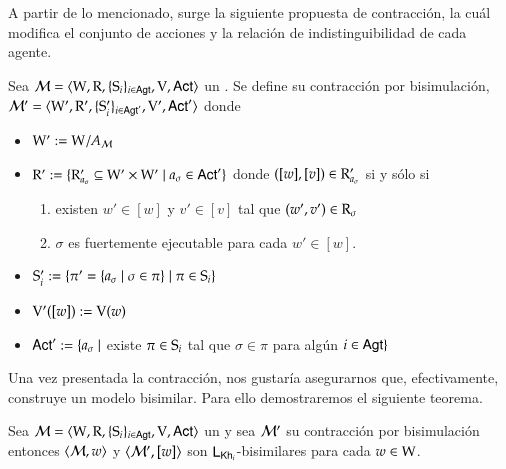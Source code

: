 A partir de lo mencionado, surge la siguiente propuesta de contracción, la cuál modifica el conjunto de acciones y la relación de indistinguibilidad 
de cada agente.


\begin{definicion}
    Sea $\model=\tup{\W,\R,\cset{\S_i}_{i \in \AGT},\V,\ACT}$ un \ults. Se define su contracción por bisimulación, $\model'=\tup{\W',\R',\cset{\S_i'}_{i \in \AGT'},\V',\ACT'}$ donde 
    \begin{center}
        \begin{itemize}
            \item $\W' := \W/A_\modults$
            \item $\R' := \{\R'_{a_\sigma} \subseteq \W' \times \W' \mid a_\sigma \in \ACT'\}$ donde $([w],[v]) \in \R'_{a_\sigma}$ si y sólo si
            \begin{enumerate}
                \item existen $w' \in [w]$ y $v' \in [v]$ tal que $(w',v')\in \R_\sigma$
                \item $\sigma$ es fuertemente ejecutable para cada $w' \in [w]$.
            \end{enumerate}
            \item $\S_i' := \{ \pi' = \{a_\sigma \mid \sigma \in \pi\} \mid \pi \in \S_i \}$
            \item $\V'([w]) := \V(w)$
            \item $\ACT' := \{a_\sigma \mid $ existe $ \pi\in \S_i$ tal que $ \sigma \in \pi$ para algún $i \in \AGT \}$ 
        \end{itemize}
    \end{center}
\end{definicion}
    
Una vez presentada la contracción, nos gustaría asegurarnos que, efectivamente, construye un modelo bisimilar. Para ello demostraremos el 
siguiente teorema.

\begin{teorema}
    Sea $\model=\tup{\W,\R,\cset{\S_i}_{i \in \AGT},\V,\ACT}$ un \ults y sea $\modults'$ su contracción por bisimulación entonces 
    $\tup{\modults,w}$ y $\tup{\modults',[w]}$ son $\KHilogic$-bisimilares para cada $w \in \W$.
\end{teorema}

